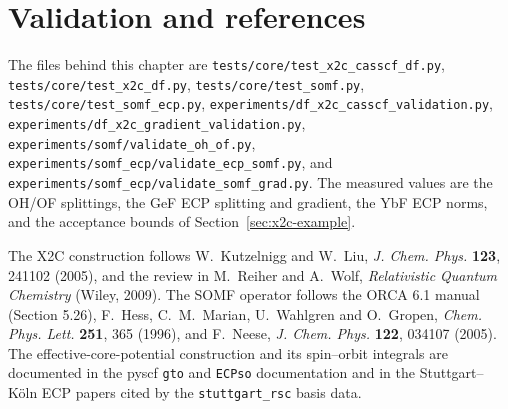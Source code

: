 \section{Validation and references}
\label{sec:x2c-validation}

{\raggedright
The files behind this chapter are
\texttt{tests/core/test\_x2c\_casscf\_df.py},
\texttt{tests/core/test\_x2c\_df.py},
\texttt{tests/core/test\_somf.py},
\texttt{tests/core/test\_somf\_ecp.py},
\texttt{experiments/df\_x2c\_casscf\_validation.py},
\texttt{experiments/df\_x2c\_gradient\_validation.py},
\texttt{experiments/somf/validate\_oh\_of.py},
\texttt{experiments/somf\_ecp/validate\_ecp\_somf.py}, and
\texttt{experiments/somf\_ecp/validate\_somf\_grad.py}.  The measured
values are the OH/OF splittings, the GeF ECP splitting and gradient,
the YbF ECP norms, and the acceptance bounds of
Section~\ref{sec:x2c-example}.\par}

The X2C construction follows W.~Kutzelnigg and W.~Liu,
\emph{J. Chem. Phys.} \textbf{123}, 241102 (2005), and the review in
M.~Reiher and A.~Wolf, \emph{Relativistic Quantum Chemistry}
(Wiley, 2009).  The SOMF operator follows the ORCA 6.1 manual
(Section 5.26), F.~Hess, C.~M.~Marian, U.~Wahlgren and O.~Gropen,
\emph{Chem. Phys. Lett.} \textbf{251}, 365 (1996), and F.~Neese,
\emph{J. Chem. Phys.} \textbf{122}, 034107 (2005).  The
effective-core-potential construction and its spin--orbit integrals
are documented in the pyscf \texttt{gto} and \texttt{ECPso}
documentation and in the Stuttgart--K\"oln ECP papers cited by the
\texttt{stuttgart\_rsc} basis data.
